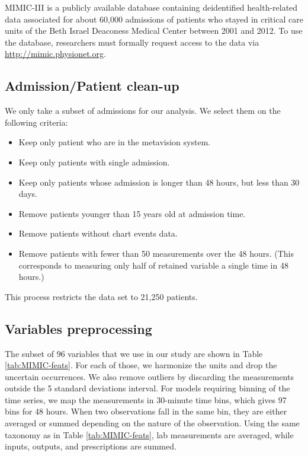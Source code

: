 \documentclass{article}
\begin{document}
MIMIC-III is a publicly available database containing deidentified health-related data associated for about 60,000 admissions of patients who stayed in critical care units of the Beth Israel Deaconess Medical Center between 2001 and 2012. To use the database, researchers must formally request access to the data via \url{http://mimic.physionet.org}. 

\subsection{Admission/Patient clean-up}

We only take a subset of admissions for our analysis. We select them on the following criteria:
\begin{itemize}
    \item Keep only patient who are in the metavision system.
    \item Keep only patients with single admission.
    \item Keep only patients whose admission is longer than 48 hours, but less than 30 days.
    \item Remove patients younger than 15 years old at admission time.
    \item Remove patients without chart events data.
\item Remove patients with fewer than 50 measurements over the 48 hours. (This corresponds to measuring only half of retained variable a single time in 48 hours.)
\end{itemize}
 This process restricts the data set to 21,250 patients.
 
\subsection{Variables preprocessing}

The subset of 96 variables that we use in our study are shown in Table \ref{tab:MIMIC-feats}.
For each of those, we harmonize the units and drop the uncertain occurrences. We also remove outliers by discarding the measurements outside the 5 standard deviations interval. For models requiring binning of the time series, we map the measurements in 30-minute time bins, which gives 97 bins for 48 hours. When two observations fall in the same bin, they are either averaged or summed depending on the nature of the observation. Using the same taxonomy as in Table \ref{tab:MIMIC-feats}, lab measurements are averaged, while inputs, outputs, and prescriptions are summed. 
\end{document}
